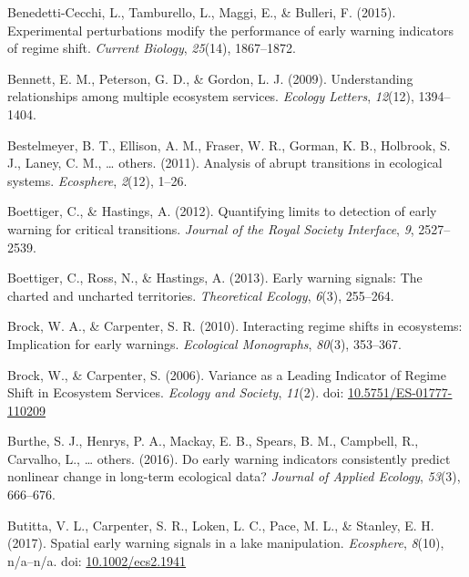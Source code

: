 \documentclass[12pt,twoside,openany]{reedthesis}
\begin{document}
\leavevmode\hypertarget{ref-benedetti2015experimental}{}%
Benedetti-Cecchi, L., Tamburello, L., Maggi, E., \& Bulleri, F. (2015). Experimental perturbations modify the performance of early warning indicators of regime shift. \emph{Current Biology}, \emph{25}(14), 1867--1872.

\leavevmode\hypertarget{ref-bennett2009understanding}{}%
Bennett, E. M., Peterson, G. D., \& Gordon, L. J. (2009). Understanding relationships among multiple ecosystem services. \emph{Ecology Letters}, \emph{12}(12), 1394--1404.

\leavevmode\hypertarget{ref-bestelmeyer_analysis_2011}{}%
Bestelmeyer, B. T., Ellison, A. M., Fraser, W. R., Gorman, K. B., Holbrook, S. J., Laney, C. M., \ldots{} others. (2011). Analysis of abrupt transitions in ecological systems. \emph{Ecosphere}, \emph{2}(12), 1--26.

\leavevmode\hypertarget{ref-boettiger_quantifying_2012}{}%
Boettiger, C., \& Hastings, A. (2012). Quantifying limits to detection of early warning for critical transitions. \emph{Journal of the Royal Society Interface}, \emph{9}, 2527--2539.

\leavevmode\hypertarget{ref-boettiger_early_2013}{}%
Boettiger, C., Ross, N., \& Hastings, A. (2013). Early warning signals: The charted and uncharted territories. \emph{Theoretical Ecology}, \emph{6}(3), 255--264.

\leavevmode\hypertarget{ref-brock2010interacting}{}%
Brock, W. A., \& Carpenter, S. R. (2010). Interacting regime shifts in ecosystems: Implication for early warnings. \emph{Ecological Monographs}, \emph{80}(3), 353--367.

\leavevmode\hypertarget{ref-brock_variance_2006}{}%
Brock, W., \& Carpenter, S. (2006). Variance as a Leading Indicator of Regime Shift in Ecosystem Services. \emph{Ecology and Society}, \emph{11}(2). doi: \href{https://doi.org/10.5751/ES-01777-110209}{10.5751/ES-01777-110209}

\leavevmode\hypertarget{ref-burthe2016early}{}%
Burthe, S. J., Henrys, P. A., Mackay, E. B., Spears, B. M., Campbell, R., Carvalho, L., \ldots{} others. (2016). Do early warning indicators consistently predict nonlinear change in long-term ecological data? \emph{Journal of Applied Ecology}, \emph{53}(3), 666--676.

\leavevmode\hypertarget{ref-butitta_spatial_2017}{}%
Butitta, V. L., Carpenter, S. R., Loken, L. C., Pace, M. L., \& Stanley, E. H. (2017). Spatial early warning signals in a lake manipulation. \emph{Ecosphere}, \emph{8}(10), n/a--n/a. doi: \href{https://doi.org/10.1002/ecs2.1941}{10.1002/ecs2.1941}
\end{document}
